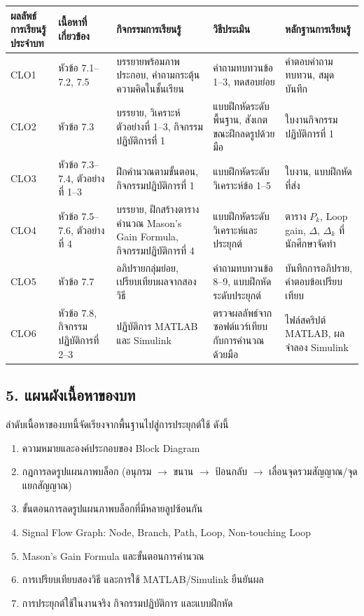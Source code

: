 \begin{table}[htbp]
    \centering
    \small
    \begin{tabularx}{\textwidth}{L{0.09\textwidth} L{0.16\textwidth} Y Y Y}
        \hline
        \textbf{ผลลัพธ์การเรียนรู้ประจำบท} & \textbf{เนื้อหาที่เกี่ยวข้อง} & \textbf{กิจกรรมการเรียนรู้} & \textbf{วิธีประเมิน} & \textbf{หลักฐานการเรียนรู้} \\
        \hline
        CLO1 & หัวข้อ 7.1–7.2, 7.5 & บรรยายพร้อมภาพประกอบ, คำถามกระตุ้นความคิดในชั้นเรียน & คำถามทบทวนข้อ 1–3, ทดสอบย่อย & คำตอบคำถามทบทวน, สมุดบันทึก \\
        CLO2 & หัวข้อ 7.3 & บรรยาย, วิเคราะห์ตัวอย่างที่ 1–3, กิจกรรมปฏิบัติการที่ 1 & แบบฝึกหัดระดับพื้นฐาน, สังเกตขณะฝึกลดรูปด้วยมือ & ใบงานกิจกรรมปฏิบัติการที่ 1 \\
        CLO3 & หัวข้อ 7.3–7.4, ตัวอย่างที่ 1–3 & ฝึกคำนวณตามขั้นตอน, กิจกรรมปฏิบัติการที่ 1 & แบบฝึกหัดระดับวิเคราะห์ข้อ 1–5 & ใบงาน, แบบฝึกหัดที่ส่ง \\
        CLO4 & หัวข้อ 7.5–7.6, ตัวอย่างที่ 4 & บรรยาย, ฝึกสร้างตารางคำนวณ Mason's Gain Formula, กิจกรรมปฏิบัติการที่ 4 & แบบฝึกหัดระดับวิเคราะห์และประยุกต์ & ตาราง $P_k$, Loop gain, $\Delta$, $\Delta_k$ ที่นักศึกษาจัดทำ \\
        CLO5 & หัวข้อ 7.7 & อภิปรายกลุ่มย่อย, เปรียบเทียบผลจากสองวิธี & คำถามทบทวนข้อ 8–9, แบบฝึกหัดระดับประยุกต์ & บันทึกการอภิปราย, คำตอบข้อเปรียบเทียบ \\
        CLO6 & หัวข้อ 7.8, กิจกรรมปฏิบัติการที่ 2–3 & ปฏิบัติการ MATLAB และ Simulink & ตรวจผลลัพธ์จากซอฟต์แวร์เทียบกับการคำนวณด้วยมือ & ไฟล์สคริปต์ MATLAB, ผลจำลอง Simulink \\
        \hline
    \end{tabularx}
\end{table}


\subsection{5. แผนผังเนื้อหาของบท}

ลำดับเนื้อหาของบทนี้จัดเรียงจากพื้นฐานไปสู่การประยุกต์ใช้ ดังนี้

\begin{enumerate}
    \item ความหมายและองค์ประกอบของ Block Diagram
    \item กฎการลดรูปแผนภาพบล็อก (อนุกรม $\rightarrow$ ขนาน $\rightarrow$ ป้อนกลับ $\rightarrow$ เลื่อนจุดรวมสัญญาณ/จุดแยกสัญญาณ)
    \item ขั้นตอนการลดรูปแผนภาพบล็อกที่มีหลายลูปซ้อนกัน
    \item Signal Flow Graph: Node, Branch, Path, Loop, Non-touching Loop
    \item Mason's Gain Formula และขั้นตอนการคำนวณ
    \item การเปรียบเทียบสองวิธี และการใช้ MATLAB/Simulink ยืนยันผล
    \item การประยุกต์ใช้ในงานจริง กิจกรรมปฏิบัติการ และแบบฝึกหัด
\end{enumerate}


